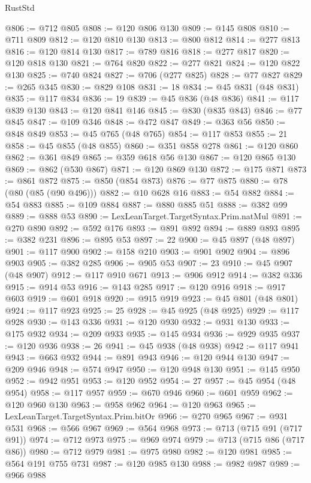 \begin{lexlean}{RustStd}
\begin{coremodule}
{\begin{coremodule}
{{{{{{{{{{{{{{{{{{{{{{{{{{{{{{{{{{{{{{{{{{{{{{{{{{{{{{{{{{{{@806 := @712 @805
@808 := @120 @806 @130
@809 := @145 @808
@810 := @711 @809
@812 := @120 @810 @130
@813 := @800 @812
@814 := @277 @813
@816 := @120 @814 @130
@817 := @789 @816
@818 := @277 @817
@820 := @120 @818 @130
@821 := @764 @820
@822 := @277 @821
@824 := @120 @822 @130
@825 := @740 @824
@827 := @706 (@277 @825)
@828 := @77 @827
@829 := @265 @345
@830 := @829 @108
@831 := 18
@834 := @45 @831 (@48 @831)
@835 := @117 @834
@836 := 19
@839 := @45 @836 (@48 @836)
@841 := @117 @839 @130
@843 := @120 @841 @146
@845 := @830 (@835 @843)
@846 := @77 @845
@847 := @109 @346
@848 := @472 @847
@849 := @363 @56
@850 := @848 @849
@853 := @45 @765 (@48 @765)
@854 := @117 @853
@855 := 21
@858 := @45 @855 (@48 @855)
@860 := @351 @858 @278
@861 := @120 @860
@862 := @361 @849
@865 := @359 @618 @56 @130
@867 := @120 @865 @130
@869 := @862 (@530 @867)
@871 := @120 @869 @130
@872 := @175 @871
@873 := @861 @872
@875 := @850 (@854 @873)
@876 := @77 @875
@880 := @78 (@80 (@85 (@90 @496)))
@882 := @10 @628 @16
@883 := @54 @882
@884 := @54 @883
@885 := @109 @884
@887 := @880 @885 @51
@888 := @382 @99
@889 := @888 @53
@890 := LexLeanTarget.TargetSyntax.Prim.natMul
@891 := @270 @890
@892 := @592 @176
@893 := @891 @892
@894 := @889 @893
@895 := @382 @231
@896 := @895 @53
@897 := 22
@900 := @45 @897 (@48 @897)
@901 := @117 @900
@902 := @158 @210
@903 := @901 @902
@904 := @896 @903
@905 := @382 @285
@906 := @905 @53
@907 := 23
@910 := @45 @907 (@48 @907)
@912 := @117 @910 @671
@913 := @906 @912
@914 := @382 @336
@915 := @914 @53
@916 := @143 @285
@917 := @120 @916
@918 := @917 @603
@919 := @601 @918
@920 := @915 @919
@923 := @45 @801 (@48 @801)
@924 := @117 @923
@925 := 25
@928 := @45 @925 (@48 @925)
@929 := @117 @928
@930 := @143 @336
@931 := @120 @930
@932 := @931 @130
@933 := @175 @932
@934 := @209 @933
@935 := @145 @934
@936 := @929 @935
@937 := @120 @936
@938 := 26
@941 := @45 @938 (@48 @938)
@942 := @117 @941
@943 := @663 @932
@944 := @891 @943
@946 := @120 @944 @130
@947 := @209 @946
@948 := @574 @947
@950 := @120 @948 @130
@951 := @145 @950
@952 := @942 @951
@953 := @120 @952
@954 := 27
@957 := @45 @954 (@48 @954)
@958 := @117 @957
@959 := @670 @946
@960 := @601 @959
@962 := @120 @960 @130
@963 := @958 @962
@964 := @120 @963
@965 := LexLeanTarget.TargetSyntax.Prim.bitOr
@966 := @270 @965
@967 := @931 @531
@968 := @566 @967
@969 := @564 @968
@973 := @713 (@715 @91 (@717 @91))
@974 := @712 @973
@975 := @969 @974
@979 := @713 (@715 @86 (@717 @86))
@980 := @712 @979
@981 := @975 @980
@982 := @120 @981
@985 := @564 @191 @755 @731
@987 := @120 @985 @130
@988 := @982 @987
@989 := @966 @988
}}}}}}}}}}}}}}}}}}}}}}}}}}}}}}}}}}}}}}}}}}}}}}}}}}}}}}}}}}}}
\end{coremodule}}
\end{coremodule}
\end{lexlean}
